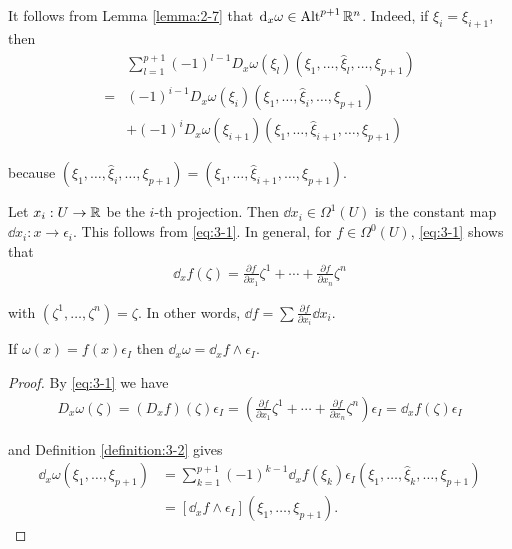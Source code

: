 It follows from Lemma \ref{lemma:2-7} that $\dd_x\omega\in\alt^{p+1}\RR^n$. Indeed, if $\xi_i = \xi_{i+1}$, then 
\begin{align*}
    &\sum_{l=1}^{p+1}\left(-1\right)^{l-1}D_{x}\omega(\xi_{l})(\xi_{1},\ldots,\hat{\xi}_{l},\ldots,\xi_{p+1}) \\
  = & (-1)^{i-1}D_{x}\omega(\xi_{i})(\xi_{1},\ldots,\hat{\xi}_{i},\ldots,\xi_{p+1}) \\
    & +(-1)^{{i}}D_{{x}}\omega(\xi_{{i+1}})(\xi_{1},\ldots,\hat{\xi}_{{i+1}},\ldots,\xi_{{p+1}})
\end{align*}


because $(\xi_1, \ldots, \hat{\xi}_i, \ldots, \xi_{p+1}) = (\xi_1, \ldots, \hat{\xi}_{i+1}, \ldots, \xi_{p+1})$.

\begin{example}\label{example:3-3}
  Let $x_i:U\to {\ensuremath{\mathbb{R}}}$ be the $i$-th projection. Then $\dd x_i\in\Omega^1(U)$ is the
  constant map $\dd x_i:x\to \epsilon_i$. This follows from \eqref{eq:3-1}. In general, for $f\in\Omega^0(U)$,
  \eqref{eq:3-1} shows that
  \begin{align}\label{eq:3-2}
    \dd_x f(\zeta) = \frac{\partial f }{\partial x_1 }\zeta^1 + \cdots + \frac{\partial f}{\partial x_n}\zeta^n
  \end{align}

  with $(\zeta^1, \ldots, \zeta^n) = \zeta$. In other words, $\dd f = \sum{\frac{\partial f}{\partial x_i}\dd x_i}$.  
\end{example}


\begin{lemma}\label{lemma:3-4}
  If $\omega(x) = f(x)\epsilon_I$ then $\dd_x\omega = \dd_xf\wedge\epsilon_I$.
\end{lemma}

\begin{proof}
  By \eqref{eq:3-1} we have
  \begin{align*}
    D_x\omega(\zeta)
    = (D_xf)(\zeta)\epsilon_I
    = \left(\frac{\partial f}{\partial x_1}\zeta^1+\cdots+\frac{\partial f}{\partial x_n}\zeta^n\right)\epsilon_I
    = \!\dd_xf(\zeta)\epsilon_I
  \end{align*}

  and Definition \ref{definition:3-2} gives
  \begin{align*}
    \dd_{x}\omega(\xi_{1},\ldots,\xi_{p+1}) 
    & = \sum_{k=1}^{p+1}\left(-1\right)^{k-1}\dd_{x}f(\xi_{k})\epsilon_{I}\left(\xi_{1},\ldots,\hat{\xi}_{k},\ldots,\xi_{p+1}\right) \\
    & = [\dd_{x}f\wedge\epsilon_{I}](\xi_{1},\ldots,\xi_{p+1}). 
  \end{align*}
\end{proof}

